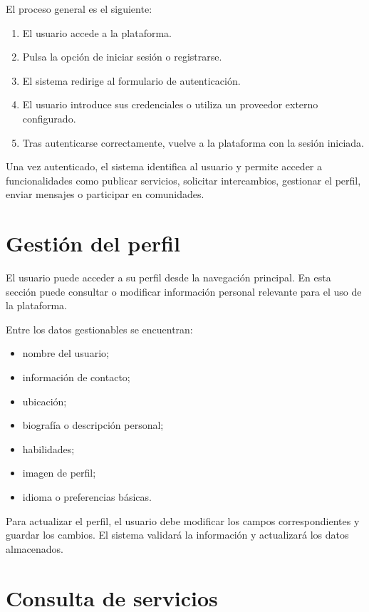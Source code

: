 El proceso general es el siguiente:

\begin{enumerate}
    \item El usuario accede a la plataforma.
    \item Pulsa la opción de iniciar sesión o registrarse.
    \item El sistema redirige al formulario de autenticación.
    \item El usuario introduce sus credenciales o utiliza un proveedor externo configurado.
    \item Tras autenticarse correctamente, vuelve a la plataforma con la sesión iniciada.
\end{enumerate}

Una vez autenticado, el sistema identifica al usuario y permite acceder a funcionalidades como publicar servicios, solicitar intercambios, gestionar el perfil, enviar mensajes o participar en comunidades.

\section{Gestión del perfil}

El usuario puede acceder a su perfil desde la navegación principal. En esta sección puede consultar o modificar información personal relevante para el uso de la plataforma.

Entre los datos gestionables se encuentran:

\begin{itemize}
    \item nombre del usuario;
    \item información de contacto;
    \item ubicación;
    \item biografía o descripción personal;
    \item habilidades;
    \item imagen de perfil;
    \item idioma o preferencias básicas.
\end{itemize}

Para actualizar el perfil, el usuario debe modificar los campos correspondientes y guardar los cambios. El sistema validará la información y actualizará los datos almacenados.

\section{Consulta de servicios}


